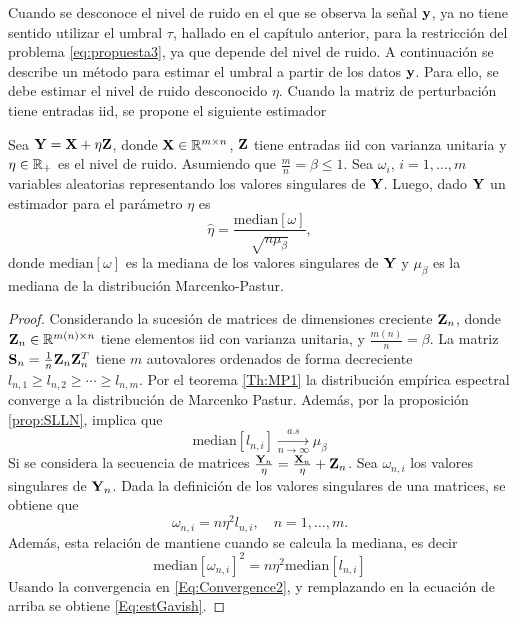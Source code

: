 Cuando se desconoce el nivel de ruido en el que se observa la señal $\mathbf{y}$, ya no tiene sentido utilizar el umbral $\tau$, hallado en el capítulo anterior, para la  restricción del problema \eqref{eq:propuesta3}, ya que depende del nivel de ruido. A continuación se describe un método para estimar el umbral a partir de los datos $\mathbf{y}$. Para ello, se debe estimar el nivel de ruido desconocido $\eta$. Cuando la matriz de perturbación tiene entradas iid, se propone el siguiente estimador
\begin{theorem}\cite{Gavish2014}\label{Theo:EstGavish}
	Sea $\mathbf{Y} = \mathbf{X} + \eta\mathbf{Z}$, donde $\mathbf{X}\in\mathbb{R}^{m\times n}$, $\mathbf{Z}$ tiene entradas iid con varianza unitaria y $\eta\in\mathbb{R}_+$ es el nivel de ruido. Asumiendo que $\frac{m}{n} = \beta\le 1$. Sea $\omega_i$, $i = 1,\ldots,m$ variables aleatorias representando los valores singulares de $\mathbf{Y}$. Luego, dado $\mathbf{Y}$ un estimador para el parámetro $\eta$ es 
	\begin{equation}
		\hat{\eta} = \frac{\mathrm{median}[\omega]}{\sqrt{n\mu_\beta}},
		\label{Eq:estGavish}
	\end{equation}
	donde $\mathrm{median}[\omega]$ es la mediana de los valores singulares de $\mathbf{Y}$ y $\mu_\beta$ es la mediana de la distribución Marcenko-Pastur.
\end{theorem}
\begin{proof}
   	Considerando la sucesión de matrices de dimensiones creciente $\mathbf{Z}_n$, donde $\mathbf{Z}_n\in\mathbb{R}^{m(n)\times n}$ tiene elementos iid con varianza unitaria, y $\frac{m(n)}{n} = \beta$. La matriz $\mathbf{S}_n=\frac{1}{n}\mathbf{Z}_n\mathbf{Z}_n^T$ tiene $m$ autovalores ordenados de forma decreciente $l_{n,1}\ge l_{n,2}\ge\cdots\ge l_{n,m}$. Por el teorema \eqref{Th:MP1} la distribución empírica espectral converge a la distribución de Marcenko Pastur. Además, por la proposición \eqref{prop:SLLN}, implica que
	\begin{equation}
	\mathrm{median}[l_{n,i}] \xrightarrow[n\to\infty]{a.s} \mu_\beta
	\label{Eq:Convergence2}
	\end{equation}
	Si se considera la secuencia de matrices $\frac{\mathbf{Y}_n}{\eta} = \frac{\mathbf{X}_n}{\eta}+ \mathbf{Z}_n$. Sea $\omega_{n,i}$ los valores singulares de $\mathbf{Y}_n$. Dada la definición de los valores singulares de una matrices, se obtiene que 
	\begin{equation}
	\omega_{n,i} = n\eta^2l_{n,i}, \quad n = 1,\ldots, m.
	\label{Eq:SingValuesMP}
	\end{equation}
	Además, esta relación de mantiene cuando se calcula la mediana, es decir
	\begin{equation}
	\mathrm{median}[\omega_{n,i}]^2 = n\eta^2\mathrm{median}[l_{n,i}]
	\label{Eq:medianSingValues}
	\end{equation}
	Usando la convergencia en \eqref{Eq:Convergence2}, y remplazando en la ecuación de arriba se obtiene \eqref{Eq:estGavish}. 
\end{proof}
